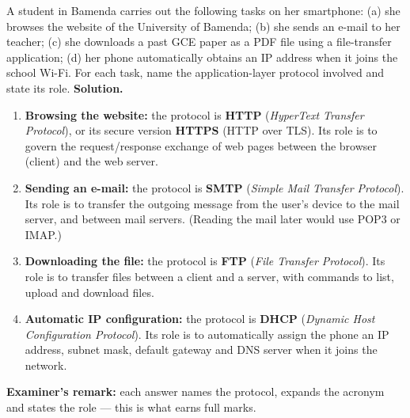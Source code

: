 \documentclass[11pt]{article}
\begin{document}
\begin{exoresolu}
A student in Bamenda carries out the following tasks on her smartphone: (a) she browses the website of the University of Bamenda; (b) she sends an e-mail to her teacher; (c) she downloads a past GCE paper as a PDF file using a file-transfer application; (d) her phone automatically obtains an IP address when it joins the school Wi-Fi. For each task, name the application-layer protocol involved and state its role.
\tcblower
\textbf{Solution.}
\begin{enumerate}
\item \textbf{Browsing the website:} the protocol is \textbf{HTTP} (\emph{HyperText Transfer Protocol}), or its secure version \textbf{HTTPS} (HTTP over TLS). Its role is to govern the request/response exchange of web pages between the browser (client) and the web server.
\item \textbf{Sending an e-mail:} the protocol is \textbf{SMTP} (\emph{Simple Mail Transfer Protocol}). Its role is to transfer the outgoing message from the user's device to the mail server, and between mail servers. (Reading the mail later would use POP3 or IMAP.)
\item \textbf{Downloading the file:} the protocol is \textbf{FTP} (\emph{File Transfer Protocol}). Its role is to transfer files between a client and a server, with commands to list, upload and download files.
\item \textbf{Automatic IP configuration:} the protocol is \textbf{DHCP} (\emph{Dynamic Host Configuration Protocol}). Its role is to automatically assign the phone an IP address, subnet mask, default gateway and DNS server when it joins the network.
\end{enumerate}
\textbf{Examiner's remark:} each answer names the protocol, expands the acronym and states the role — this is what earns full marks.
\end{exoresolu}
\end{document}

